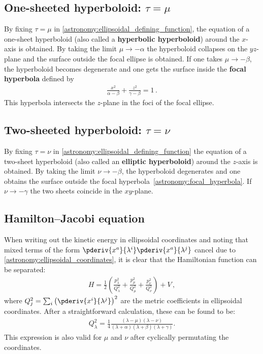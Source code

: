 \subsection{One-sheeted hyperboloid: \texorpdfstring{$\tau=\mu$}{tau equals mu}}

    By fixing $\tau=\mu$ in \cref{astronomy:ellipsoidal_defining_function}, the equation of a one-sheet hyperboloid (also called a \textbf{hyperbolic hyperboloid}) around the $x$-axis is obtained. By taking the limit $\mu\longrightarrow-\alpha$ the hyperboloid collapses on the $yz$-plane and the surface outside the focal ellipse is obtained. If one takes $\mu\longrightarrow-\beta$, the hyperboloid becomes degenerate and one gets the surface inside the \textbf{focal hyperbola} defined by
    \begin{gather}
        \label{astronomy:focal_hyperbola}
        \frac{x^2}{\alpha-\beta} + \frac{z^2}{\gamma-\beta} = 1\,.
    \end{gather}
    This hyperbola intersects the $z$-plane in the foci of the focal ellipse.

\subsection{Two-sheeted hyperboloid: \texorpdfstring{$\tau = \nu$}{}}

    By fixing $\tau=\nu$ in \cref{astronomy:ellipsoidal_defining_function} the equation of a two-sheet hyperboloid (also called an \textbf{elliptic hyperboloid}) around the $z$-axis is obtained. By taking the limit $\nu\longrightarrow-\beta$, the hyperboloid degenerates and one obtains the surface outside the focal hyperbola~\eqref{astronomy:focal_hyperbola}. If $\nu\longrightarrow-\gamma$ the two sheets coincide in the $xy$-plane.

\subsection{Hamilton--Jacobi equation}

    When writing out the kinetic energy in ellipsoidal coordinates and noting that mixed terms of the form $\pderiv{x^a}{\lambda^i}\pderiv{x^a}{\lambda^j}$ cancel due to \cref{astronomy:ellipsoidal_coordinates}, it is clear that the Hamiltonian function can be separated:
    \begin{gather}
        H = \frac{1}{2}\left(\frac{p_\lambda^2}{Q_\lambda^2} + \frac{p_\mu^2}{Q_\mu^2} + \frac{p_\nu^2}{Q_\nu^2}\right) + V\,,
    \end{gather}
    where $Q_j^2 = \sum_i\left(\pderiv{x^i}{\lambda^j}\right)^2$ are the metric coefficients in ellipsoidal coordinates. After a straightforward calculation, these can be found to be:
    \begin{gather}
        Q_\lambda^2 = \frac{1}{4}\frac{(\lambda-\mu)(\lambda-\nu)}{(\lambda+\alpha)(\lambda+\beta)(\lambda+\gamma)}.
    \end{gather}
    This expression is also valid for $\mu$ and $\nu$ after cyclically permutating the coordinates.


